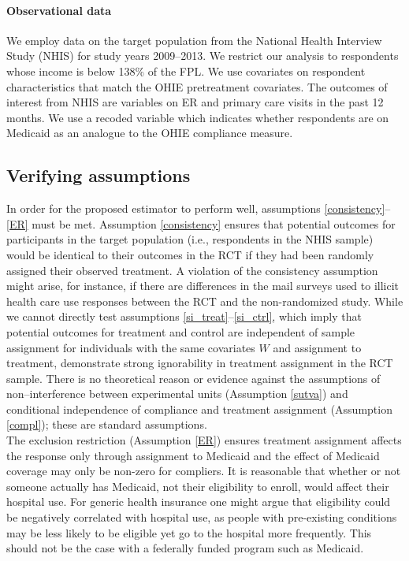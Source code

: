\documentclass[12pt]{article}
\begin{document}
\paragraph{Observational data} 

We employ data on the target population from the National Health Interview Study (NHIS) \cite{NHIS} for study years 2009--2013.  We restrict our analysis to respondents whose income is below 138\% of the FPL. We use covariates on respondent characteristics that match the OHIE pretreatment covariates. The outcomes of interest from NHIS are variables on ER  and primary care visits in the past 12 months. We use a recoded variable which indicates whether respondents are on Medicaid as an analogue to the OHIE compliance measure.

\subsection{Verifying assumptions}

In order for the proposed estimator to perform well, assumptions \eqref{consistency}--\eqref{ER} must be met.  Assumption \eqref{consistency} ensures that potential outcomes for participants in the target population (i.e., respondents in the NHIS sample) would be identical to their outcomes in the RCT if they had been randomly assigned their observed treatment. A violation of the consistency assumption might arise, for instance, if there are differences in the mail surveys used to illicit health care use responses between the RCT and the non-randomized study. While we cannot directly test assumptions \eqref{si_treat}--\eqref{si_ctrl}, which imply that potential outcomes for treatment and control are independent of sample assignment for individuals with the same covariates $W$ and assignment to treatment, \citet{finkelstein2012} demonstrate strong ignorability in treatment assignment in the RCT sample. There is no theoretical reason or evidence against the assumptions of non--interference between experimental units (Assumption \ref{sutva}) and conditional independence of compliance and treatment assignment (Assumption \ref{compl}); these are standard assumptions. \\

The exclusion restriction (Assumption \ref{ER}) ensures treatment assignment affects the response only through assignment to Medicaid  and the effect of Medicaid coverage may only be non-zero for compliers. It is reasonable that whether or not someone actually has Medicaid, not their eligibility to enroll, would affect their hospital use.  For generic health insurance one might argue that eligibility could be negatively correlated with hospital use, as people with pre-existing conditions may be less likely to be eligible yet go to the hospital more frequently.  This should not be the case with a federally funded program such as Medicaid. \\
\end{document}
